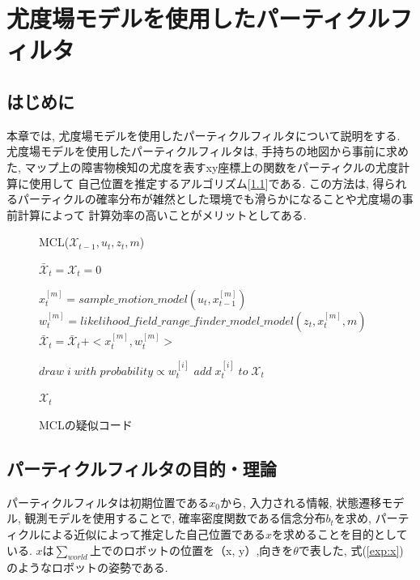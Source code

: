 \chapter{尤度場モデルを使用したパーティクルフィルタ}
\section{はじめに}
本章では, 尤度場モデルを使用したパーティクルフィルタについて説明をする. 
尤度場モデルを使用したパーティクルフィルタは, 手持ちの地図から事前に求めた, 
マップ上の障害物検知の尤度を表すxy座標上の関数をパーティクルの尤度計算に使用して
自己位置を推定するアルゴリズム[\ref{alg:mcl}]である. 
この方法は, 得られるパーティクルの確率分布が雑然とした環境でも滑らかになることや尤度場の事前計算によって
計算効率の高いことがメリットとしてある. 

\begin{figure}[h]
  \begin{algorithm}[H]
      \caption{MCL($\mathcal{X}_{t-1}, u_t, z_t, m$)}
      \label{alg:mcl}
      \begin{algorithmic}
      \STATE $\mathcal{\bar{X}}_t = \mathcal{X}_t = 0$

      \STATE $x_{t}^{[m]} = sample\_motion\_model(u_{t}, x_{t-1}^{[m]})$
      \STATE $w_{t}^{[m]} = likelihood\_field\_range\_finder\_model\_model(z_{t}, x_{t}^{[m]}, m)$
      \STATE $\mathcal{\bar{X}}_t = \mathcal{\bar{X}}_t + <x_{t}^{[m]}, w_{t}^{[m]}>$
      \ENDFOR

      \STATE $draw\;i\;with\;probability \propto w_{t}^{[i]}$
      \STATE $add\; x_{t}^{[i]}\;to\;\mathcal{X}_t$
      \ENDFOR

      \RETURN $\mathcal{X}_t$
      \end{algorithmic}
  \end{algorithm}
  \caption{MCLの疑似コード}
\end{figure}

\section{パーティクルフィルタの目的・理論}

パーティクルフィルタは初期位置である$x_0$から, 入力される情報, 状態遷移モデル, 観測モデルを使用することで, 
確率密度関数である信念分布$b_t$を求め, パーティクルによる近似によって推定した自己位置である$x$を求めることを目的としている. 
$x$は$\sum_{world}$上でのロボットの位置を（x, y）,向きを$\theta$で表した, 
式(\ref{exp:x})のようなロボットの姿勢である. 

